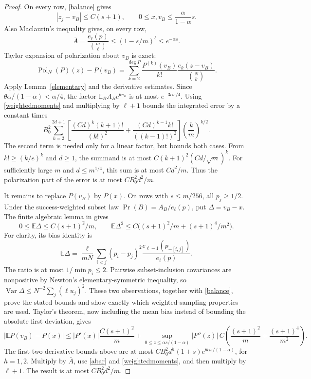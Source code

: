 \documentclass[11pt]{article}
\newcommand{\E}{\mathbb E}
\newcommand{\Pol}{\operatorname{Pol}}
\begin{document}
\begin{proof}
On every row, \eqref{balance} gives
\[
 |z_j-v_B|\le C(s+1),\qquad
 0\le x,v_B\le\frac{\alpha}{1-\alpha}s.
\]
Also Maclaurin's inequality gives, on every row,
\begin{equation}\label{abar}
 \overline A=\frac{e_\ell(p)}{\binom m\ell}
        \le(1-s/m)^\ell\le e^{-\alpha s}.
\end{equation}
Taylor expansion of polarization about $v_B$ is exact:
\[
 \Pol_N(P)(z)-P(v_B)
  =\sum_{k=2}^{\deg P}\frac{P^{(k)}(v_B)}{k!}
                   \frac{e_k(z-v_B)}{\binom Nk}.
\]
Apply Lemma~\ref{elementary} and the derivative estimates.
Since $\theta\alpha/(1-\alpha)<\alpha/4$, the factor
$\E_B A_Be^{\theta v_B}$ is at most $e^{-3\alpha s/4}$.
Using \eqref{weightedmoments} and multiplying by $\ell+1$ bounds the
integrated error by a constant times
\[
 B_0^2\sum_{k=2}^{2d+1}
 \left[
  \frac{(Cd)^k(k+1)!}{(k!)^2}
  +\frac{(Cd)^{k-1}k!}{((k-1)!)^2}
 \right]\left(\frac{k}{m}\right)^{k/2}.
\]
The second term is needed only for a linear factor, but bounds both
cases. From $k!\ge(k/e)^k$ and $d\ge1$, the summand is at most
$C(k+1)^2(Cd/\sqrt m)^k$. For sufficiently large $m$ and
$d\le m^{1/4}$, this sum is at most $Cd^2/m$. Thus the polarization
part of the error is at most $CB_0^2d^2/m$.

It remains to replace $P(v_B)$ by $P(x)$. On rows with $s\le m/256$,
all $p_j\ge1/2$. Under the success-weighted subset law
$\Pr(B)=A_B/e_\ell(p)$, put $\Delta=v_B-x$. The finite algebraic
lemma in
gives
\[
 0\le\E\Delta\le C(s+1)^2/m,\qquad
 \E\Delta^2\le C\bigl((s+1)^2/m+(s+1)^4/m^2\bigr).
\]
For clarity, its bias identity is
\[
 \E\Delta=\frac{\ell}{mN}\sum_{i<j}(p_i-p_j)^2
                 \frac{e_{\ell-1}(p_{-[i,j]})}{e_\ell(p)}.
\]
The ratio is at most $1/\min p_i\le2$. Pairwise subset-inclusion
covariances are nonpositive by Newton's elementary-symmetric inequality,
so $\operatorname{Var}\Delta\le N^{-2}\sum_j(\ell u_j)^2$.
These two observations, together with \eqref{balance}, prove the stated
bounds and show exactly which weighted-sampling properties are used.
Taylor's theorem, now including the mean bias instead of bounding the
absolute first deviation, gives
\[
 |\E P(v_B)-P(x)|
 \le |P'(x)|\frac{C(s+1)^2}{m}
 +\sup_{0\le z\le\alpha s/(1-\alpha)}|P''(z)|\,
 C\left(\frac{(s+1)^2}{m}+\frac{(s+1)^4}{m^2}\right).
\]
The first two derivative bounds above are at most
$CB_0^2d^h(1+s)e^{\theta\alpha s/(1-\alpha)}$, for $h=1,2$.
Multiply by $\overline A$, use \eqref{abar} and
\eqref{weightedmoments}, and then multiply by $\ell+1$.
The result is at most $CB_0^2d^2/m$.


\end{proof}
\end{document}
